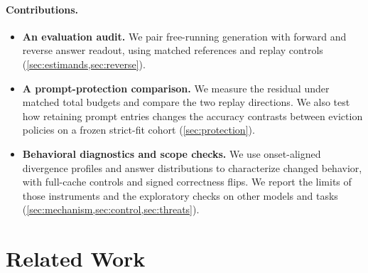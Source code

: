 \documentclass{article}
\begin{document}
\paragraph{Contributions.}
\begin{itemize}[leftmargin=1.6em,itemsep=2pt]
  \item \textbf{An evaluation audit.} We pair free-running generation with forward and reverse answer readout, using matched references and replay controls (\cref{sec:estimands,sec:reverse}).
  \item \textbf{A prompt-protection comparison.} We measure the residual under matched total budgets and compare the two replay directions. We also test how retaining prompt entries changes the accuracy contrasts between eviction policies on a frozen strict-fit cohort (\cref{sec:protection}).
  \item \textbf{Behavioral diagnostics and scope checks.} We use onset-aligned divergence profiles and answer distributions to characterize changed behavior, with full-cache controls and signed correctness flips. We report the limits of those instruments and the exploratory checks on other models and tasks (\cref{sec:mechanism,sec:control,sec:threats}).
\end{itemize}

\section{Related Work}
\label{sec:related}
\end{document}
